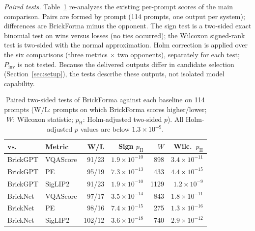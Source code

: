 \documentclass[letterpaper]{article} %
\begin{document}
\emph{Paired tests.} Table~\ref{tab:sig} re-analyzes the existing per-prompt scores of the main comparison. Pairs are formed by prompt (114 prompts, one output per system); differences are BrickForma minus the opponent. The sign test is a two-sided exact binomial test on wins versus losses (no ties occurred); the Wilcoxon signed-rank test is two-sided with the normal approximation. Holm correction is applied over the six comparisons (three metrics $\times$ two opponents), separately for each test; $P_{\mathrm{inv}}$ is not tested. Because the delivered outputs differ in candidate selection (Section~\ref{sec:setup}), the tests describe these outputs, not isolated model capability.

\begin{table}[!htbp]
\centering
\small
\setlength{\tabcolsep}{3pt}
\begin{tabular}{llrrrr}
\toprule
vs. & Metric & W/L & Sign $p_{\mathrm{H}}$ & $W$ & Wilc.\ $p_{\mathrm{H}}$ \\
\midrule
BrickGPT & VQAScore & 91/23 & $1.9{\times}10^{-10}$ & 898 & $3.4{\times}10^{-11}$ \\
BrickGPT & PE & 95/19 & $7.3{\times}10^{-13}$ & 433 & $4.4{\times}10^{-15}$ \\
BrickGPT & SigLIP2 & 91/23 & $1.9{\times}10^{-10}$ & 1129 & $1.2{\times}10^{-9}$ \\
BrickNet & VQAScore & 97/17 & $3.5{\times}10^{-14}$ & 843 & $1.8{\times}10^{-11}$ \\
BrickNet & PE & 98/16 & $7.4{\times}10^{-15}$ & 275 & $1.3{\times}10^{-16}$ \\
BrickNet & SigLIP2 & 102/12 & $3.6{\times}10^{-18}$ & 740 & $2.9{\times}10^{-12}$ \\
\bottomrule
\end{tabular}
\caption{Paired two-sided tests of BrickForma against each baseline on 114 prompts (W/L: prompts on which BrickForma scores higher/lower; $W$: Wilcoxon statistic; $p_{\mathrm{H}}$: Holm-adjusted two-sided $p$). All Holm-adjusted $p$ values are below $1.3{\times}10^{-9}$.}
\label{tab:sig}
\end{table}
\end{document}
